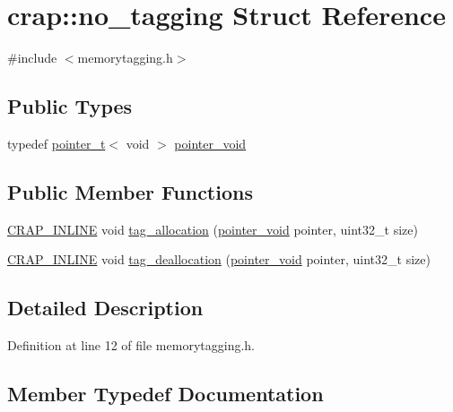 \hypertarget{structcrap_1_1no__tagging}{}\section{crap\+:\+:no\+\_\+tagging Struct Reference}
\label{structcrap_1_1no__tagging}


{\ttfamily \#include $<$memorytagging.\+h$>$}

\subsection*{Public Types}
\begin{DoxyCompactItemize}
\item 
typedef \hyperlink{structcrap_1_1pointer__t}{pointer\+\_\+t}$<$ void $>$ \hyperlink{structcrap_1_1no__tagging_ad6207e0a8c15892cc0263e77e0e0add6}{pointer\+\_\+void}
\end{DoxyCompactItemize}
\subsection*{Public Member Functions}
\begin{DoxyCompactItemize}
\item 
\hyperlink{config__x86_8h_a5a40526b8d842e7ff731509998bb0f1c}{C\+R\+A\+P\+\_\+\+I\+N\+L\+I\+N\+E} void \hyperlink{structcrap_1_1no__tagging_abcce3996166dd8c007c0dd3fbbcce05d}{tag\+\_\+allocation} (\hyperlink{structcrap_1_1no__tagging_ad6207e0a8c15892cc0263e77e0e0add6}{pointer\+\_\+void} pointer, uint32\+\_\+t size)
\item 
\hyperlink{config__x86_8h_a5a40526b8d842e7ff731509998bb0f1c}{C\+R\+A\+P\+\_\+\+I\+N\+L\+I\+N\+E} void \hyperlink{structcrap_1_1no__tagging_a956afc0ce49ae5213a93e6a52e4abc92}{tag\+\_\+deallocation} (\hyperlink{structcrap_1_1no__tagging_ad6207e0a8c15892cc0263e77e0e0add6}{pointer\+\_\+void} pointer, uint32\+\_\+t size)
\end{DoxyCompactItemize}


\subsection{Detailed Description}


Definition at line 12 of file memorytagging.\+h.



\subsection{Member Typedef Documentation}
\hypertarget{structcrap_1_1no__tagging_ad6207e0a8c15892cc0263e77e0e0add6}{}
